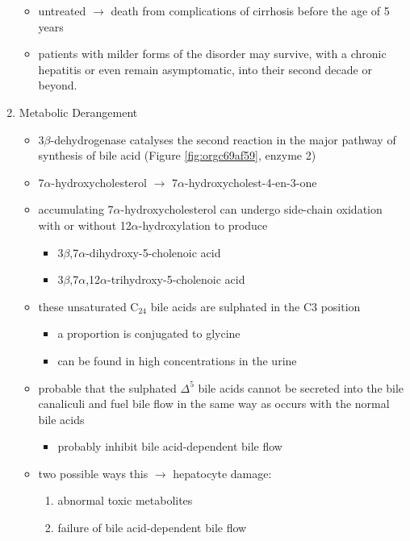 \documentclass{scrartcl}
\begin{document}
\begin{enumerate}
\begin{itemize}
\item untreated \(\to\) death from complications of cirrhosis before the age
of 5 years
\item patients with milder forms of the disorder may survive, with a
chronic hepatitis or even remain asymptomatic, into their second
decade or beyond.
\end{itemize}
\item Metabolic Derangement
\label{sec:org763548d}
\begin{itemize}
\item 3\(\beta\)-dehydrogenase catalyses the second reaction in the major
pathway of synthesis of bile acid (Figure \ref{fig:orgc69af59}, enzyme 2)
\item 7\(\alpha\)-hydroxycholesterol \(\to\) 7\(\alpha\)-hydroxycholest-4-en-3-one
\item accumulating 7\(\alpha\)-hydroxycholesterol can undergo side-chain
oxidation with or without 12\(\alpha\)-hydroxylation to produce
\begin{itemize}
\item 3\(\beta\),7\(\alpha\)-dihydroxy-5-cholenoic acid
\item 3\(\beta\),7\(\alpha\),12\(\alpha\)-trihydroxy-5-cholenoic acid
\end{itemize}
\item these unsaturated C\(_{\text{24}}\) bile acids are sulphated in the C3 position
\begin{itemize}
\item a proportion is conjugated to glycine
\item can be found in high concentrations in the urine
\end{itemize}
\item probable that the sulphated \(\Delta^{\text{5}}\) bile acids cannot be secreted
into the bile canaliculi and fuel bile flow in the same way as
occurs with the normal bile acids
\begin{itemize}
\item probably inhibit bile acid-dependent bile flow
\end{itemize}
\item two possible ways this \(\to\) hepatocyte damage:
\begin{enumerate}
\item abnormal toxic metabolites
\item failure of bile acid-dependent bile flow
\end{enumerate}
\end{itemize}


\end{enumerate}
\end{document}
